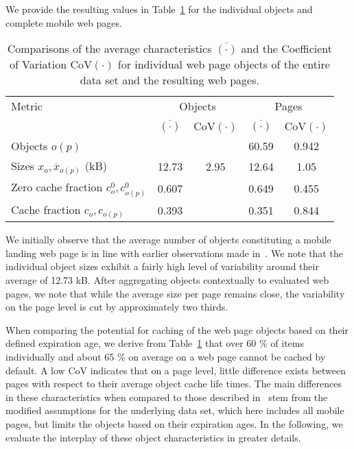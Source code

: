 We provide the resulting values in Table~\ref{tab:res} for the individual objects and complete mobile web pages.
\begin{table}[]
	\centering
	\caption{Comparisons of the average characteristics $\overline{(\cdot)}$ and the Coefficient of Variation CoV$(\cdot)$ for individual web page objects of the entire data set and the resulting web pages.\label{tab:res}}
	\begin{tabular}{|l||c|c||c|c|}
		\hline
		Metric                    & \multicolumn{2}{|c||}{Objects} & \multicolumn{2}{|c|}{Pages} \\
		& $\overline{(\cdot)}$ &  CoV$(\cdot)$  & $\overline{(\cdot)}$ & CoV$(\cdot)$ \\ \hline
		Objects $o(p)$            &               &        &          60.59          &    0.942     \\ \hline
		
		Sizes $x_o,\overline{x}_{o(p)}$ (kB)        &         12.73        &     2.95     &         12.64         &    1.05     \\ \hline

		Zero cache fraction $c^0_o,c^0_{o(p)}$ &        0.607      &          &        0.649         &  0.455     \\ \hline
		
		Cache fraction $c_o,c_{o(p)}$        &        0.393         &         &        0.351         &  0.844      \\ \hline
	\end{tabular}
\end{table} 
We initially observe that the average number of objects constituting a mobile landing web page is in line with earlier observations made in~\cite{JoSe14Commag}.
We note that the individual object sizes exhibit a fairly high level of variability around their average of 12.73 kB.
After aggregating objects contextually to evaluated web pages, we note that while the average size per page remains close, the variability on the page level is cut by approximately two thirds.

When comparing the potential for caching of the web page objects based on their defined expiration age, we derive from Table~\ref{tab:res} that over 60 \% of items individually and about 65 \% on average on a web page cannot be cached by default. 
A low CoV indicates that on a page level, little difference exists between pages with respect to their average object cache life times. 
The main differences in these characteristics when compared to those described in~\cite{JoSe14Commag} stem from the modified assumptions for the underlying data set, which here includes all mobile pages, but limits the objects based on their expiration ages.
In the following, we evaluate the interplay of these object characteristics in greater details.

